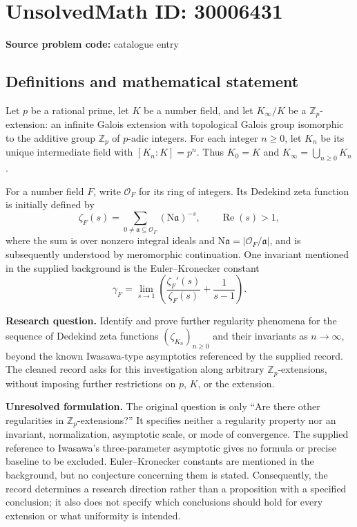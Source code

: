 \documentclass[11pt]{article}
\newcommand{\Z}{\mathbb{Z}}
\begin{document}
\section*{UnsolvedMath ID: 30006431}
\textbf{Source problem code:} catalogue entry
\subsection{Definitions and mathematical statement}
Let \(p\) be a rational prime, let \(K\) be a number field, and let \(K_\infty/K\) be a \(\Z_p\)-extension: an infinite Galois extension with topological Galois group isomorphic to the additive group \(\Z_p\) of \(p\)-adic integers. For each integer \(n\geq 0\), let \(K_n\) be its unique intermediate field with \([K_n:K]=p^n\). Thus \(K_0=K\) and \(K_\infty=\bigcup_{n\geq 0}K_n\).

For a number field \(F\), write \(\mathcal O_F\) for its ring of integers. Its Dedekind zeta function is initially defined by
\[
\zeta_F(s)=\sum_{0\neq\mathfrak a\subseteq\mathcal O_F}(\mathrm N\mathfrak a)^{-s},\qquad \operatorname{Re}(s)>1,
\]
where the sum is over nonzero integral ideals and \(\mathrm N\mathfrak a=|\mathcal O_F/\mathfrak a|\), and is subsequently understood by meromorphic continuation. One invariant mentioned in the supplied background is the Euler--Kronecker constant
\[
\gamma_F=\lim_{s\to 1}\left(\frac{\zeta_F'(s)}{\zeta_F(s)}+\frac{1}{s-1}\right).
\]

\textbf{Research question.} Identify and prove further regularity phenomena for the sequence of Dedekind zeta functions \((\zeta_{K_n})_{n\geq 0}\) and their invariants as \(n\to\infty\), beyond the known Iwasawa-type asymptotics referenced by the supplied record. The cleaned record asks for this investigation along arbitrary \(\Z_p\)-extensions, without imposing further restrictions on \(p\), \(K\), or the extension.

\textbf{Unresolved formulation.} The original question is only ``Are there other regularities in \(\Z_p\)-extensions?'' It specifies neither a regularity property nor an invariant, normalization, asymptotic scale, or mode of convergence. The supplied reference to Iwasawa's three-parameter asymptotic gives no formula or precise baseline to be excluded. Euler--Kronecker constants are mentioned in the background, but no conjecture concerning them is stated. Consequently, the record determines a research direction rather than a proposition with a specified conclusion; it also does not specify which conclusions should hold for every extension or what uniformity is intended.
\end{document}
